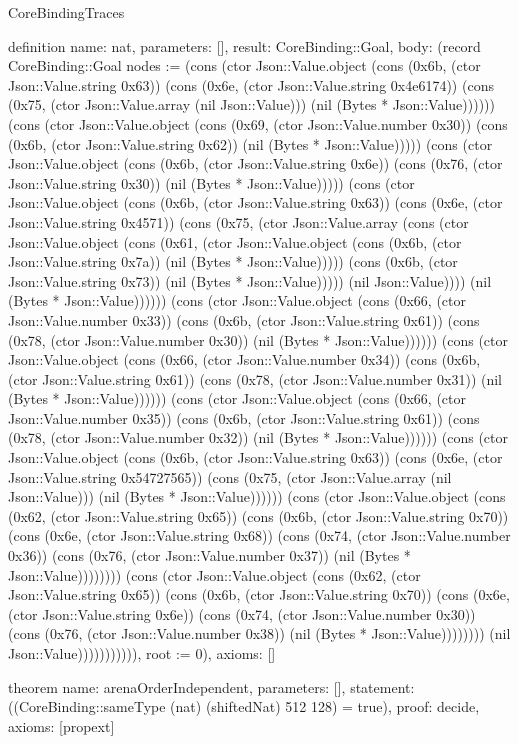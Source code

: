 \begin{lexlean}{CoreBindingTraces}
\begin{semanticmodule}
definition{
 name: nat,
 parameters: [],
 result: CoreBinding::Goal,
 body: (record CoreBinding::Goal {nodes := (cons (ctor Json::Value.object (cons (0x6b, (ctor Json::Value.string 0x63)) (cons (0x6e, (ctor Json::Value.string 0x4e6174)) (cons (0x75, (ctor Json::Value.array (nil Json::Value))) (nil (Bytes * Json::Value)))))) (cons (ctor Json::Value.object (cons (0x69, (ctor Json::Value.number 0x30)) (cons (0x6b, (ctor Json::Value.string 0x62)) (nil (Bytes * Json::Value))))) (cons (ctor Json::Value.object (cons (0x6b, (ctor Json::Value.string 0x6e)) (cons (0x76, (ctor Json::Value.string 0x30)) (nil (Bytes * Json::Value))))) (cons (ctor Json::Value.object (cons (0x6b, (ctor Json::Value.string 0x63)) (cons (0x6e, (ctor Json::Value.string 0x4571)) (cons (0x75, (ctor Json::Value.array (cons (ctor Json::Value.object (cons (0x61, (ctor Json::Value.object (cons (0x6b, (ctor Json::Value.string 0x7a)) (nil (Bytes * Json::Value))))) (cons (0x6b, (ctor Json::Value.string 0x73)) (nil (Bytes * Json::Value))))) (nil Json::Value)))) (nil (Bytes * Json::Value)))))) (cons (ctor Json::Value.object (cons (0x66, (ctor Json::Value.number 0x33)) (cons (0x6b, (ctor Json::Value.string 0x61)) (cons (0x78, (ctor Json::Value.number 0x30)) (nil (Bytes * Json::Value)))))) (cons (ctor Json::Value.object (cons (0x66, (ctor Json::Value.number 0x34)) (cons (0x6b, (ctor Json::Value.string 0x61)) (cons (0x78, (ctor Json::Value.number 0x31)) (nil (Bytes * Json::Value)))))) (cons (ctor Json::Value.object (cons (0x66, (ctor Json::Value.number 0x35)) (cons (0x6b, (ctor Json::Value.string 0x61)) (cons (0x78, (ctor Json::Value.number 0x32)) (nil (Bytes * Json::Value)))))) (cons (ctor Json::Value.object (cons (0x6b, (ctor Json::Value.string 0x63)) (cons (0x6e, (ctor Json::Value.string 0x54727565)) (cons (0x75, (ctor Json::Value.array (nil Json::Value))) (nil (Bytes * Json::Value)))))) (cons (ctor Json::Value.object (cons (0x62, (ctor Json::Value.string 0x65)) (cons (0x6b, (ctor Json::Value.string 0x70)) (cons (0x6e, (ctor Json::Value.string 0x68)) (cons (0x74, (ctor Json::Value.number 0x36)) (cons (0x76, (ctor Json::Value.number 0x37)) (nil (Bytes * Json::Value)))))))) (cons (ctor Json::Value.object (cons (0x62, (ctor Json::Value.string 0x65)) (cons (0x6b, (ctor Json::Value.string 0x70)) (cons (0x6e, (ctor Json::Value.string 0x6e)) (cons (0x74, (ctor Json::Value.number 0x30)) (cons (0x76, (ctor Json::Value.number 0x38)) (nil (Bytes * Json::Value)))))))) (nil Json::Value))))))))))), root := 0}),
 axioms: []
}

theorem{
 name: arenaOrderIndependent,
 parameters: [],
 statement: ((CoreBinding::sameType (nat) (shiftedNat) 512 128) = true),
 proof: decide{},
 axioms: [propext]
}
\end{semanticmodule}
\end{lexlean}
